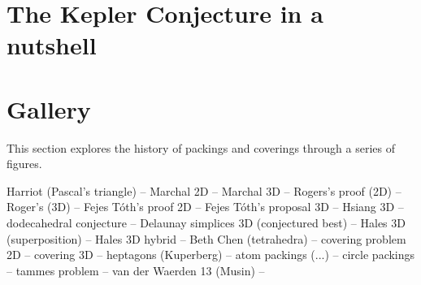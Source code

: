 \section{The Kepler Conjecture in a nutshell}

\section{Gallery}

This section explores the history of  packings and coverings through a series of figures.

Harriot (Pascal's triangle) -- 
Marchal 2D -- Marchal 3D --  Rogers's proof (2D) -- Roger's (3D) -- Fejes T\'oth's proof 2D --
Fejes T\'oth's proposal 3D -- Hsiang 3D -- dodecahedral conjecture --
Delaunay simplices 3D (conjectured best) -- Hales 3D (superposition) --
Hales 3D hybrid -- Beth Chen (tetrahedra) -- covering problem 2D --
covering 3D -- heptagons (Kuperberg) -- atom packings (...) -- circle packings --
tammes problem --
van der Waerden 13 (Musin) -- 



\clearpage







